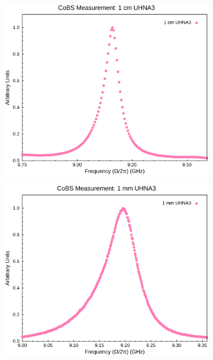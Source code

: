 \begin{figure}[t]
  \centering
  \begin{subfigure}[b]{0.49\textwidth}
    \centering
    \hspace{-2em}
    \includegraphics[width=\textwidth]{figs/4-Raman/CoBS Measurement: 1 cm UHNA3.png}
    \label{fig:Raman:1cmUHNA3}
  \end{subfigure}
  \hfill
  \begin{subfigure}[b]{0.49\textwidth}
    \centering
    \hspace{-2em}
    \includegraphics[width=\textwidth]{figs/4-Raman/CoBS Measurement: 1 mm UHNA3.png}

\end{subfigure}
\end{figure}
